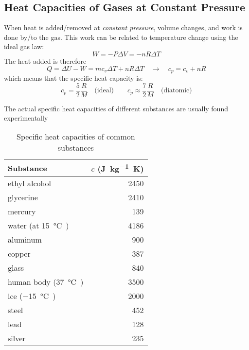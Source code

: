 \subsection{Heat Capacities of Gases at Constant Pressure}

When heat is added/removed at \emph{constant pressure}, volume changes, and
work is done by/to the gas. This work can be related to temperature change
using the ideal gas law:
\begin{equation}
  W=-P\Delta V = -nR\Delta T
\end{equation}
The heat added is therefore
\begin{equation}
  Q=\Delta U - W =mc_v\Delta T + nR\Delta T\quad\rightarrow\quad
  \boxed{c_p=c_v+nR}
\end{equation}
%
%
%
%
%
%
which means that the specific heat capacity is:
\begin{equation}
  c_p=\frac52\frac RM\quad\text{(ideal)}\quad\quad
  c_p\approx\frac72\frac RM\quad\text{(diatomic)}
\end{equation}

The actual specific heat capacities of different substances are usually
found experimentally
%
\begin{table}[ht]
  \centering
  \begin{tabular}{|l|r|}
    \hline
    \rowcolor{pink}
    \textbf{Substance} & $c$ (\si{\joule\per\kilo\gram.\kelvin}) \\
    \hline
    ethyl alcohol & 2450 \\
    glycerine     & 2410 \\
    mercury       & 139 \\
    water (at \SI{15}\celsius) & 4186 \\
    \hline
    aluminum & 900 \\
    copper   & 387 \\
    glass    & 840 \\
    human body (\SI{37}\celsius) & 3500 \\
    ice (\SI{-15}\celsius)       & 2000 \\
    steel    & 452 \\
    lead     & 128 \\
    silver   & 235 \\
    \hline
  \end{tabular}
  \caption{Specific heat capacities of common substances}
  \label{tabl:specific-heat-capacity}
\end{table} 


